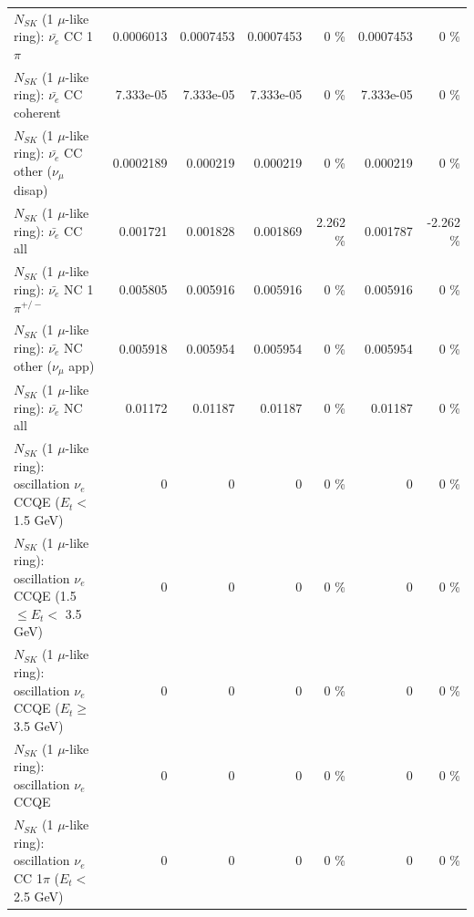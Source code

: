 \begin{table}
\begin{tabular}{| l | r | r | r  r | r  r |}
\hline
                           $N_{SK}$ (1 $\mu$-like ring): $\bar{\nu_e}$ CC 1$\pi$ &       0.0006013 &       0.0007453 &       0.0007453 &        0 \%  &       0.0007453 &        0 \%  \\ 
                         $N_{SK}$ (1 $\mu$-like ring): $\bar{\nu_e}$ CC coherent &       7.333e-05 &       7.333e-05 &       7.333e-05 &        0 \%  &       7.333e-05 &        0 \%  \\ 
          $N_{SK}$ (1 $\mu$-like ring): $\bar{\nu_e}$ CC other ($\nu_\mu$ disap) &       0.0002189 &        0.000219 &        0.000219 &        0 \%  &        0.000219 &        0 \%  \\ 
                            $N_{SK}$ (1 $\mu$-like ring): $\bar{\nu_{e}}$ CC all &        0.001721 &        0.001828 &        0.001869 &    2.262 \%  &        0.001787 &   -2.262 \%  \\ 
\hline
                     $N_{SK}$ (1 $\mu$-like ring): $\bar{\nu_e}$ NC 1$\pi^{+/-}$ &        0.005805 &        0.005916 &        0.005916 &        0 \%  &        0.005916 &        0 \%  \\ 
            $N_{SK}$ (1 $\mu$-like ring): $\bar{\nu_e}$ NC other ($\nu_\mu$ app) &        0.005918 &        0.005954 &        0.005954 &        0 \%  &        0.005954 &        0 \%  \\ 
                            $N_{SK}$ (1 $\mu$-like ring): $\bar{\nu_{e}}$ NC all &         0.01172 &         0.01187 &         0.01187 &        0 \%  &         0.01187 &        0 \%  \\ 
\hline
\hline
\hline
      $N_{SK}$ (1 $\mu$-like ring): oscillation $\nu_e$ CCQE ($E_{t} <$ 1.5 GeV) &               0 &               0 &               0 &        0 \%  &               0 &        0 \%  \\ 
$N_{SK}$ (1 $\mu$-like ring): oscillation $\nu_e$ CCQE (1.5 $\leq E_{t} <$ 3.5 GeV) &               0 &               0 &               0 &        0 \%  &               0 &        0 \%  \\ 
   $N_{SK}$ (1 $\mu$-like ring): oscillation $\nu_e$ CCQE ($E_{t} \geq$ 3.5 GeV) &               0 &               0 &               0 &        0 \%  &               0 &        0 \%  \\ 
\hline
                          $N_{SK}$ (1 $\mu$-like ring): oscillation $\nu_e$ CCQE &               0 &               0 &               0 &        0 \%  &               0 &        0 \%  \\ 
\hline
 $N_{SK}$ (1 $\mu$-like ring): oscillation $\nu_e$ CC 1$\pi$ ($E_{t} <$ 2.5 GeV) &               0 &               0 &               0 &        0 \%  &               0 &        0 \%  \\ 

\end{tabular}
\end{table}
